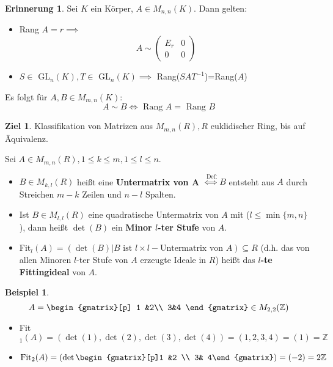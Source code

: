 \documentclass[a4paper, titlepage]{article}
\theoremstyle{definition}
\newtheorem{bsp}[satz]{Beispiel}
\newtheorem*{ziel}{Ziel}
\newtheorem*{erin}{Erinnerung}
\newcommand{\Z}{\mathbb{Z}}
\begin{document}
\begin{erin}
Sei $K$ ein Körper, $A\in M_{n,n}(K)$. Dann gelten:
\end{erin}
\begin{itemize}
    \item Rang $A=r\implies$ $$ A\sim 
    \left(\begin{array}{c|c} E_r& 0\\ 
        \hline 0& 0
    \end{array}\right)$$
    \item $S\in$ GL$_{n}(K),T\in$ GL$_{n}(K)\implies $ Rang($SAT^{-1}$)=Rang($A$)
\end{itemize}
Es folgt für $A,B\in M_{m,n}(K):$
$$A\sim B \Leftrightarrow \text{ Rang } A= \text{ Rang }B$$
\begin{ziel}
    Klassifikation von Matrizen aus $M_{m,n}(R), R $ euklidischer Ring, bis auf Äquivalenz.
\end{ziel}
\begin{definition}
    Sei $A\in M_{m,n}(R), 1\leq k\leq m, 1\leq l\leq n$. 
    \begin{itemize}
        \item $B\in M_{k,l}(R)$ heißt eine \textbf{Untermatrix von A }$\overset{\text{ Def:}}{\Leftrightarrow} B$ entsteht aus $A$ durch Streichen $m-k$ Zeilen und $n-l$ Spalten. 
        \item Ist $B\in M_{l,l}(R)$ eine quadratische Untermatrix von $A$ mit ($l\leq \min\{m,n\}$), dann heißt $\det(B)$ ein \textbf{Minor $l$-ter Stufe }von $A$. 
        \item Fit$_{l}(A)=(\det(B)|B \text{ ist }l\times l-\text{Untermatrix von }A )\subseteq R$ (d.h. das von allen Minoren $l$-ter Stufe von $A$ erzeugte Ideale in $R$) heißt das \textbf{$l$-te Fittingideal} von $A$.
    \end{itemize}
\end{definition}
\begin{bsp}
    $$A=\begin{gmatrix}[p] 1 &2\\
        3&4
    \end{gmatrix}\in M_{2,2}(\Z)$$
    \begin{itemize}
    \item Fit$_{1}(A)=(\det(1),\det(2),\det(3),\det(4))=(1,2,3,4)=(1)=\Z$
    \item $$\operatorname{Fit}_{2}(A)=\left(\det\begin{gmatrix}[p]1 &2 \\ 3& 4\end{gmatrix}\right)=(-2)=2\Z$$
    \end{itemize}
\end{bsp}
\end{document}
